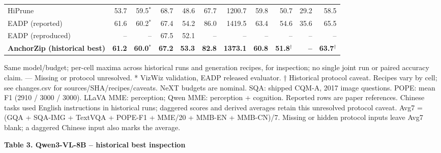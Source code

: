 \documentclass[10pt,a4paper]{article}
\begin{document}
{\begin{tabular}{lrrrrrrrrrr}
HiPrune & 53.7 & 59.5$^{*}$ & 68.7 & 48.6 & 67.7 & 1200.7 & 59.8 & 50.7 & 29.2 & 58.5 \\
EADP (reported) & 61.6 & 60.2$^{*}$ & 67.4 & 54.2 & 86.0 & 1419.5 & 63.4 & 54.6 & 35.6 & 65.5 \\
EADP (reproduced) & -- & -- & 67.5 & 52.1 & -- & -- & -- & -- & -- & -- \\
\textbf{AnchorZip (historical best)} & \textbf{61.2} & \textbf{60.0$^{*}$} & \textbf{67.2} & \textbf{53.3} & \textbf{82.8} & \textbf{1373.1} & \textbf{60.8} & \textbf{51.8$^{\dagger}$} & \textbf{--} & \textbf{63.7$^{\dagger}$} \\
\bottomrule\end{tabular}}\endgroup\par\medskip
{\footnotesize Same model/budget; per-cell maxima across historical runs and generation recipes, for inspection; no single joint run or paired accuracy claim. — Missing or protocol unresolved. * VizWiz validation, EADP released evaluator. † Historical protocol caveat. Recipes vary by cell; see changes.csv for sources/SHA/recipes/caveats. NeXT budgets are nominal. SQA: shipped CQM-A, 2017 image questions. POPE: mean F1 (2910 / 3000 / 3000). LLaVA MME: perception; Qwen MME: perception + cognition. Reported rows are paper references. Chinese tasks used English instructions in historical runs; daggered scores and derived averages retain this unresolved protocol caveat. Avg7 = (GQA + SQA-IMG + TextVQA + POPE-F1 + MME/20 + MMB-EN + MMB-CN)/7. Missing or hidden protocol inputs leave Avg7 blank; a daggered Chinese input also marks the average.\par}
\newpage
{\large\textbf{Table 3. Qwen3-VL-8B -- historical best inspection}}\par\medskip
\begingroup\setlength{\tabcolsep}{3.2pt}\renewcommand{\arraystretch}{1.03}
\end{document}

